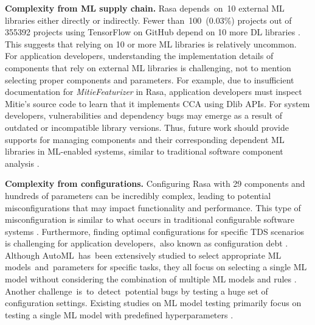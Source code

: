 \textbf{Complexity from ML supply chain.} Rasa depends~on~10 external ML libraries either directly or indirectly. Fewer than~100~(0.03\%) projects out of 355392 projects using TensorFlow on GitHub depend on 10 more DL libraries \cite{supply_chain}. This suggests that relying on 10 or more ML libraries is relatively uncommon.
For application developers, understanding the implementation details of components that rely on external ML libraries is challenging, not to mention selecting proper components and parameters. For example, due to insufficient documentation for \textit{MitieFeaturizer} in Rasa, application developers must inspect Mitie's source code to learn that it implements CCA using Dlib APIs. 
For system developers, vulnerabilities \cite{npm_technical_lag} and dependency bugs \cite{dependency_bug} may emerge as a result of outdated or incompatible library versions. 
Thus, future work should provide supports for managing components and their corresponding dependent ML libraries in ML-enabled systems, similar to traditional software component analysis \cite{Foo2019TheDO}.

\textbf{Complexity from configurations.} Configuring Rasa with 29 components and hundreds of parameters can be incredibly complex, leading to potential misconfigurations that may impact functionality and performance. This type of misconfiguration is similar to what occurs in traditional configurable software systems \cite{configurable_system}. Furthermore, finding optimal configurations for specific TDS scenarios is challenging for application developers,~also known as configuration debt \cite{hidden_technical_debt}. Although AutoML~has~been extensively studied to select appropriate ML models~and~parameters for specific tasks, they all focus on selecting a single ML model without considering the combination of multiple ML models and rules  \cite{XinHe2021AutoMLAS}. Another challenge~is~to~detect~potential bugs by testing a huge set of configuration settings. Existing studies on ML model testing primarily focus on testing a single ML model with predefined hyperparameters \cite{ml_testing}.
 

